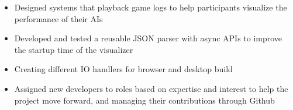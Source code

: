 
\begin{itemize}
  \item Designed systems that playback game logs to help participants visualize
  the performance of their AIs
  \item Developed and tested a reusable JSON parser with async APIs
  to improve the startup time of the visualizer
  \item Creating different IO handlers for browser and desktop build
  \item Assigned new developers to roles based on expertise and interest
  to help the project move forward, and managing their contributions through
  Github
\end{itemize}
